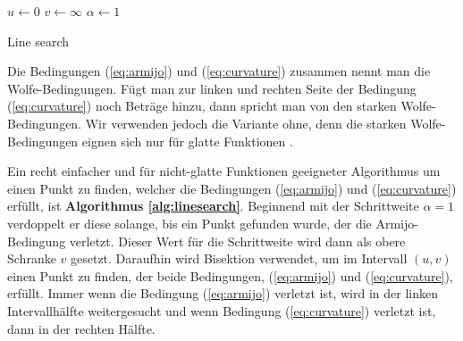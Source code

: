 \documentclass[runningheads,a4paper]{llncs}
\begin{document}
\begin{algorithm}[H]
\DontPrintSemicolon{}
\SetAlgoLined
{}
\BlankLine{}
$u \leftarrow 0$\; $v \leftarrow \infty$\; $\alpha \leftarrow 1$ \;
\caption{Line search \cite{DBLP:journals/mp/LewisO13}}
\label{alg:linesearch}
\end{algorithm}
\vspace{1.5em}

Die Bedingungen (\ref{eq:armijo}) und (\ref{eq:curvature}) zusammen nennt man die Wolfe-Bedingungen. Fügt man zur linken und rechten Seite der Bedingung (\ref{eq:curvature}) noch Beträge hinzu, dann spricht man von den starken Wolfe-Bedingungen. Wir verwenden jedoch die Variante ohne, denn die starken Wolfe-Bedingungen eignen sich nur für glatte Funktionen \cite{DBLP:journals/mp/LewisO13}.

Ein recht einfacher und für nicht-glatte Funktionen geeigneter Algorithmus um einen Punkt zu finden, welcher die Bedingungen (\ref{eq:armijo}) und (\ref{eq:curvature}) erfüllt, ist \textbf{Algorithmus \ref{alg:linesearch}}. Beginnend mit der Schrittweite $\alpha=1$ verdoppelt er diese solange, bis ein Punkt gefunden wurde, der die Armijo-Bedingung verletzt. Dieser Wert für die Schrittweite wird dann als obere Schranke $v$ gesetzt. Daraufhin wird Bisektion verwendet, um im Intervall $(u,v)$ einen Punkt zu finden, der beide Bedingungen, (\ref{eq:armijo}) und (\ref{eq:curvature}), erfüllt. Immer wenn die Bedingung (\ref{eq:armijo}) verletzt ist, wird in der linken Intervallhälfte weitergesucht und wenn Bedingung (\ref{eq:curvature}) verletzt ist, dann in der rechten Hälfte.
\end{document}
